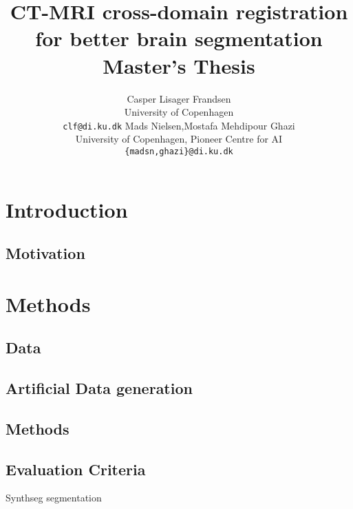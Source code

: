 \documentclass{article}
\title{
  CT-MRI cross-domain registration for better brain segmentation\\
  Master's Thesis
}
\author{Casper Lisager Frandsen\\
  University of Copenhagen\\
  \texttt{clf@di.ku.dk}
  \AND           %
  Mads Nielsen,\;\;Mostafa Mehdipour Ghazi\\
  University of Copenhagen, Pioneer Centre for AI\\
  \texttt{\{madsn,ghazi\}@di.ku.dk}
}
\begin{document}
\maketitle

\tableofcontents
%


\section{Introduction}

\subsection{Motivation}

\section{Methods}
%
\subsection{Data}


\subsection{Artificial Data generation}


\subsection{Methods}
\subsection{Evaluation Criteria}\label{method:criteria}
Synthseg segmentation\cite{synthseg1}\cite{synthseg2}
\end{document}
